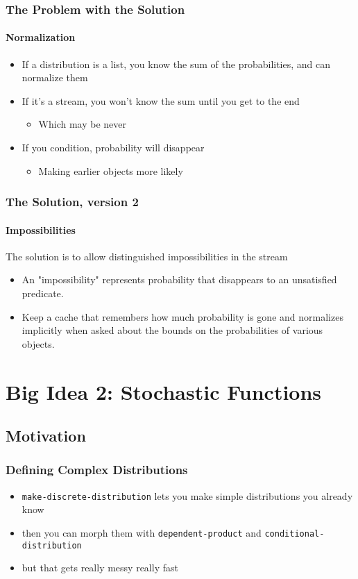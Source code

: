 \documentclass{beamer}
\newcommand{\code}[1]{\texttt{#1}}
\begin{document}
\begin{frame}
  \frametitle{The Problem with the Solution}
  \framesubtitle{Normalization}

  \begin{itemize}
  \item If a distribution is a list, you know the sum of the probabilities,
  and can normalize them
  \item If it's a stream, you won't know the sum until you get to the end
    \begin{itemize}
    \item Which may be never
    \end{itemize}
  \item If you condition, probability will disappear
    \begin{itemize}
    \item Making earlier objects more likely
    \end{itemize}
  \end{itemize}
\end{frame}

\begin{frame}
  \frametitle{The Solution, version 2}
  \framesubtitle{Impossibilities}

  The solution is to allow distinguished impossibilities in the stream
  \begin{itemize}
  \item An "impossibility" represents probability that disappears
  to an unsatisfied predicate.
  \item Keep a cache that remembers how much probability is gone and 
  normalizes implicitly when asked about the bounds on the
  probabilities of various objects.
  \end{itemize}

\end{frame}

\section{Big Idea 2: Stochastic Functions}

\subsection{Motivation}

\begin{frame}
  \frametitle{Defining Complex Distributions}

  \begin{itemize}
  \item \code{make-discrete-distribution} lets you make simple 
  distributions you already know
  \item then you can morph them with \code{dependent-product}
  and \code{conditional-distribution}
  \item but that gets really messy really fast
  \end{itemize}

\end{frame}
\end{document}
